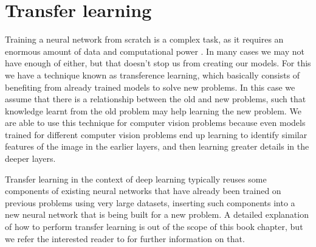 \section{Transfer learning} \label{transferlearning}
Training a neural network from scratch is a complex task, as it requires an enormous amount of data and computational power \cite{elgendy2020}. In many cases we may not have enough of either, but that doesn't stop us from creating our models. For this we have a technique known as transference learning, which basically consists of benefiting from already trained models to solve new problems. In this case we assume that there is a relationship between the old and new problems, such that knowledge learnt from the old problem may help learning the new problem. 
We are able to use this technique for computer vision problems because even models trained for different computer vision problems end up learning to identify similar features of the image in the earlier layers, and then learning greater details in the deeper layers. %


Transfer learning in the context of deep learning typically reuses some components of existing neural networks that have already been trained on previous problems using very large datasets, inserting such components into a new neural network that is being built for a new problem. A detailed explanation of how to perform transfer learning is out of the scope of this book chapter, but we refer the interested reader to \cite{elgendy2020} for further information on that.

